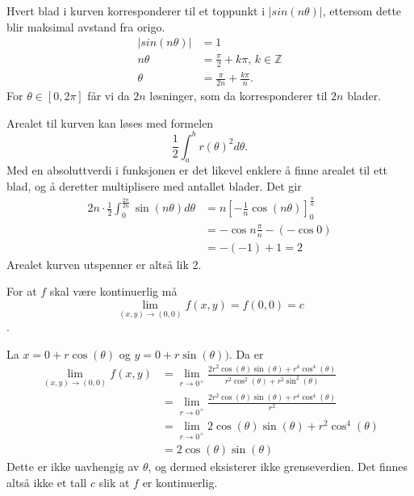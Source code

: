 \documentclass[11pt, a4paper, norsk]{NTNUoving}
\begin{document}
\begin{oppgave}
    Hvert blad i kurven korresponderer til et toppunkt i $|sin(n\theta)|$, ettersom dette blir maksimal avstand fra origo. 
    \begin{align*}
        |sin(n\theta)| &=1\\
        n\theta &= \frac{\pi}{2} +k\pi \text{, } k\in\mathbb{Z}\\
        \theta &= \frac{\pi}{2n} +\frac{k\pi}{n}.
    \end{align*}
    For $\theta \in [0,2\pi]$ får vi da $2n$ løsninger, som da korresponderer til $2n$ blader.
    
    Arealet til kurven kan løses med formelen 
    \begin{equation}
        \frac{1}{2}\int_a^b r(\theta)^2d\theta.
        \label{areal_polar}
    \end{equation}
    Med  en absoluttverdi i funksjonen er det likevel enklere å finne arealet til ett blad, og å deretter multiplisere med antallet blader. Det gir
    \begin{align*}
        2n\cdot \frac{1}{2}\int_0^{\frac{2\pi}{2n}} \sin{(n\theta)}d\theta &=
        n\left[-\frac{1}{n} \cos{(n\theta)}\right]_0^{\frac{\pi}{n}}
        \\&= -\cos{n\frac{\pi}{n}} -(-\cos{0})
        \\&= -(-1) + 1 = 2
    \end{align*}
    Arealet kurven utspenner er altså lik 2. 
\end{oppgave}

\begin{oppgave}
    For at $f$ skal være kontinuerlig må $$\lim_{(x,y)\to(0,0)} f(x,y) = f(0,0) = c$$. 
    
    La $x = 0 +r\cos(\theta)$ og $y = 0+ r\sin(\theta))$. Da er
    \begin{align*}
        \lim_{(x,y)\to(0,0)} f(x,y) &= \lim_{r\to 0^{+}}\frac{2r^2\cos(\theta)\sin(\theta) + r^4\cos^4(\theta)}{r^2\cos^2(\theta)+r^2\sin^2(\theta)}
        \\&= \lim_{r\to 0^{+}}\frac{2r^2\cos(\theta)\sin(\theta) + r^4\cos^4(\theta)}{r^2}
        \\&=\lim_{r\to 0^{+}}2\cos(\theta)\sin(\theta) + r^2\cos^4(\theta)
        \\&=2\cos(\theta)\sin(\theta)
    \end{align*}
    Dette er ikke uavhengig av $\theta$, og dermed eksisterer ikke grenseverdien. Det finnes altså ikke et tall $c$ slik at $f$ er kontinuerlig. 
\end{oppgave}
\end{document}
